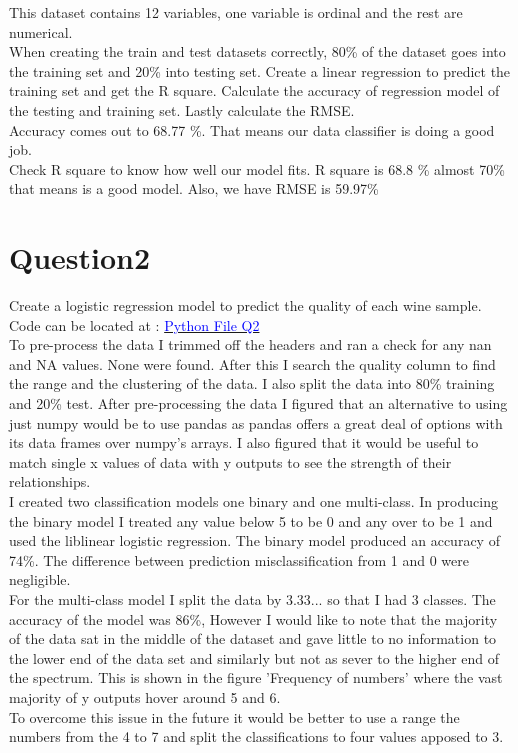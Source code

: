 \documentclass[11pt,a4paper]{scrartcl}
\begin{document}
This dataset contains 12 variables, one variable is ordinal and the rest are numerical.\\

When creating the train and test datasets correctly, 80\% of the dataset goes into the training set and 20\% into testing set. Create a linear regression to predict the training set and get the R square. Calculate the accuracy of regression model of the testing and training set. Lastly calculate the RMSE.\\

Accuracy comes out to 68.77 \%. That means our data classifier is doing a good job.\\

Check R square to know how well our model fits. R square is 68.8 \% almost 70\% that means is a good model. Also, we have RMSE is 59.97\%

\newpage
\section{Question2}
	Create a logistic regression model to predict the quality of each wine sample.\\
Code can be located at :  \href{https://github.com/MS19393924/Assignment-1-Group-9/blob/a2b6a9d1d7f083a31166de573c10290efd0e8029/Forrest/QuestionTwoV2.py}{\textcolor{blue}{Python File Q2}} \\
To pre-process the data I trimmed off the headers and ran a check for any nan and NA values. None were found. After this I search the quality column to find the range and the clustering of the data. I also split the data into 80\% training and 20\% test.
After pre-processing the data I figured that an alternative to using just numpy would be to use pandas as pandas offers a great deal of options with its data frames over numpy’s arrays. I also figured that it would be useful to match single x values of data with y outputs to see the strength of their relationships.\\
I created two classification models one binary and one multi-class. In producing the binary model I treated any value below 5 to be 0 and any over to be 1 and used the liblinear logistic regression. The binary model produced an accuracy of 74\%.
The difference between prediction misclassification from 1 and 0 were negligible. \\
For the multi-class model I split the data by 3.33... so that I had 3 classes. The accuracy of the model was 86\%, However I would like to note that the majority of the data sat in the middle of the dataset and gave little to no information to the lower end of the data set and similarly but not as sever to the higher end of
the spectrum. This is shown in the figure 'Frequency of numbers' where the vast majority of y outputs hover around 5 and 6.\\
To overcome this issue in the future it would be better to use a range the numbers from the 4 to 7 and split the classifications to four values apposed to 3.
\end{document}
